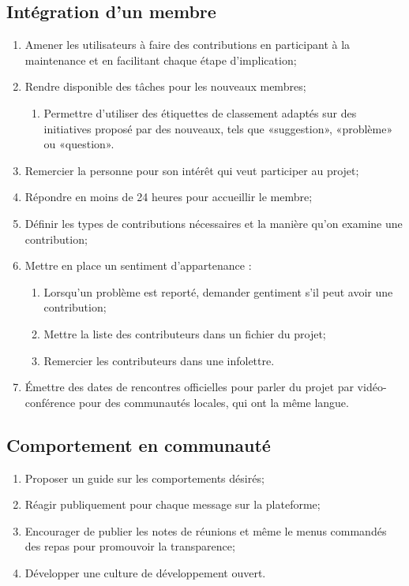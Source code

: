 \subsection{Intégration d’un membre}

\begin{enumerate}
    \item Amener les utilisateurs à faire des contributions en participant à la maintenance et en facilitant chaque étape d'implication;
    \item Rendre disponible des tâches pour les nouveaux membres;
    \begin{enumerate}
        \item Permettre d'utiliser des étiquettes de classement adaptés sur des initiatives proposé par des nouveaux, tels que «suggestion», «problème» ou «question».
    \end{enumerate}
    \item Remercier la personne pour son intérêt qui veut participer au projet;
    \item Répondre en moins de 24 heures pour accueillir le membre;
    \item Définir les types de contributions nécessaires et la manière qu'on examine une contribution;
    \item Mettre en place un sentiment d'appartenance :
    \begin{enumerate}
        \item Lorsqu'un problème est reporté, demander gentiment s'il peut avoir une contribution;
        \item Mettre la liste des contributeurs dans un fichier du projet;
        \item Remercier les contributeurs dans une infolettre.
    \end{enumerate}
    \item Émettre des dates de rencontres officielles pour parler du projet par vidéo-conférence pour des communautés locales, qui ont la même langue.
\end{enumerate}

\subsection{Comportement en communauté}

\begin{enumerate}
    \item Proposer un guide sur les comportements désirés;
    \item Réagir publiquement pour chaque message sur la plateforme;
    \item Encourager de publier les notes de réunions et même le menus commandés des repas pour promouvoir la transparence;
    \item Développer une culture de développement ouvert.
\end{enumerate}

